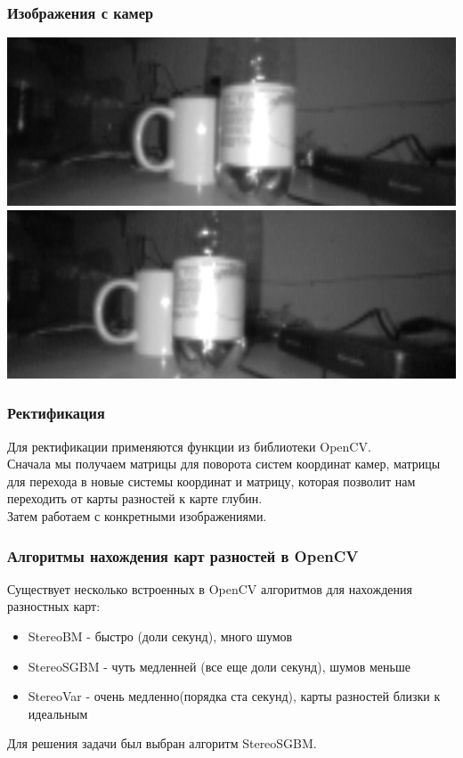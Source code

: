 \documentclass{beamer}
\begin{document}
		\begin{frame}
		    \frametitle{Изображения с камер}
		   
		    \begin{center}
				\includegraphics[scale=0.4]{images/rectL}
				\includegraphics[scale=0.4]{images/rectR}
			\end{center}
		\end{frame}
		
		\begin{frame}
			\frametitle{Ректификация}
			
			Для ректификации применяются функции из библиотеки OpenCV.\\
			Сначала мы получаем матрицы для поворота систем координат камер, матрицы для
			перехода в новые системы координат и матрицу, которая позволит нам переходить
			от карты разностей к карте глубин.\\
			Затем работаем с конкретными изображениями.
		\end{frame}
		
		\begin{frame}
			\frametitle{Алгоритмы нахождения карт разностей в OpenCV}
			
			Существует несколько встроенных в OpenCV алгоритмов для нахождения разностных 
			карт:
			\begin{itemize}
				\item StereoBM - быстро (доли секунд), много шумов
				\item StereoSGBM - чуть медленней (все еще доли секунд), шумов меньше
				\item StereoVar - очень медленно(порядка ста секунд), карты разностей 	
					  близки к идеальным
			\end{itemize}	
			Для решения задачи был выбран алгоритм StereoSGBM.
		\end{frame}
		
\end{document}
